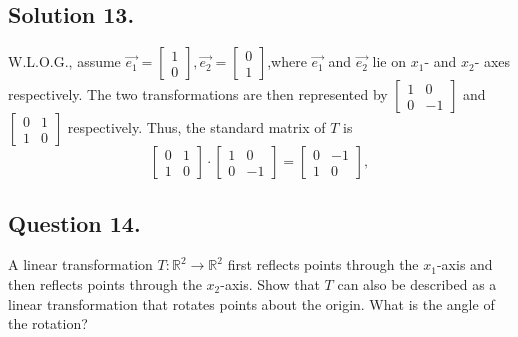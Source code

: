 \documentclass{article}
\begin{document}
\subsection*{Solution 13.}
W.L.O.G., assume $\Vec{e_1}=\left[\begin{array}{c}1\\0\end{array}\right],\Vec{e_2}=\left[\begin{array}{c}0\\1\end{array}\right]$,where $\vec{e_1}$ and $\vec{e_2}$ lie on $x_1$- and $x_2$- axes respectively.\newline
The two transformations are then represented by $\left[\begin{array}{cc}1&0\\0&-1\end{array}\right]$ and $\left[\begin{array}{cc}0&1\\1&0\end{array}\right]$ respectively.\newline
Thus, the standard matrix of $T$ is 
\[\left[\begin{array}{cc}0&1\\1&0\end{array}\right]\cdot \left[\begin{array}{cc}1&0\\0&-1\end{array}\right]=\left[\begin{array}{cc}0&-1\\1&0\end{array}\right],\]
\subsection*{Question 14.}
A linear transformation $T:\mathbb{R}^2\rightarrow \mathbb{R}^2$ first reflects points through the $x_1$-axis and then reflects points through the $x_2$-axis. Show that $T$ can also be described as a linear transformation that rotates points about the origin. What is the angle of the rotation?
\end{document}
